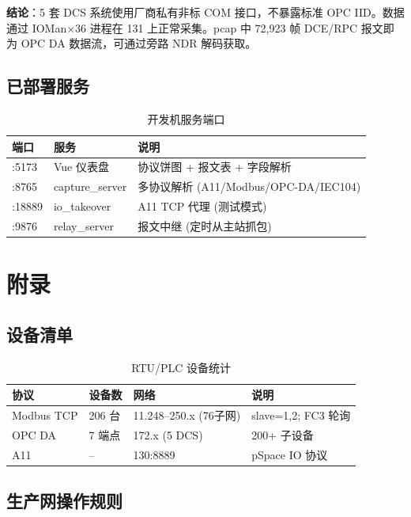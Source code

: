 \documentclass[12pt,a4paper]{ctexart}
\begin{document}
\textbf{结论}：5 套 DCS 系统使用厂商私有非标 COM 接口，不暴露标准 OPC IID。数据通过 IOMan×36 进程在 131 上正常采集。pcap 中 72,923 帧 DCE/RPC 报文即为 OPC DA 数据流，可通过旁路 NDR 解码获取。

\subsection{已部署服务}

\begin{table}[H]\centering
\caption{开发机服务端口}
\begin{tabular}{p{2cm} p{3.5cm} p{6.5cm}}
\toprule
\textbf{端口} & \textbf{服务} & \textbf{说明} \\
\midrule
:5173 & Vue 仪表盘 & 协议饼图 + 报文表 + 字段解析 \\
:8765 & capture\_server & 多协议解析 (A11/Modbus/OPC-DA/IEC104) \\
:18889 & io\_takeover & A11 TCP 代理 (测试模式) \\
:9876 & relay\_server & 报文中继 (定时从主站抓包) \\
\bottomrule
\end{tabular}
\end{table}

\section{附录}

\subsection{设备清单}

\begin{table}[H]\centering
\caption{RTU/PLC 设备统计}
\begin{tabular}{p{3cm} p{2cm} p{3.5cm} p{3cm}}
\toprule
\textbf{协议} & \textbf{设备数} & \textbf{网络} & \textbf{说明} \\
\midrule
Modbus TCP & 206 台 & 11.248--250.x (76子网) & slave=1,2; FC3 轮询 \\
OPC DA & 7 端点 & 172.x (5 DCS) & 200+ 子设备 \\
A11 & -- & 130:8889 & pSpace IO 协议 \\
\bottomrule
\end{tabular}
\end{table}

\subsection{生产网操作规则}
\end{document}
